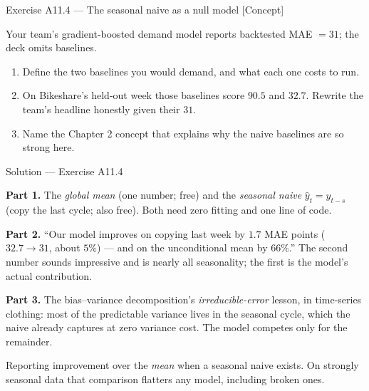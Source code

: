 \documentclass[aspectratio=169,11pt]{beamer}
\begin{document}
\begin{frame}{Exercise A11.4 --- The seasonal naive as a null model [Concept]}
  \begin{exercise}
    Your team's gradient-boosted demand model reports backtested MAE $= 31$; the
    deck omits baselines.
    \begin{enumerate}
      \item Define the two baselines you would demand, and what each one costs to
            run.
      \item On Bikeshare's held-out week those baselines score $90.5$ and $32.7$.
            Rewrite the team's headline honestly given their $31$.
      \item Name the Chapter 2 concept that explains why the naive baselines are
            so strong here.
    \end{enumerate}
  \end{exercise}
\end{frame}

\begin{frame}{Solution --- Exercise A11.4}
  \begin{solutionbox}
    \footnotesize
    \textbf{Part 1.} The \emph{global mean} (one number; free) and the
    \emph{seasonal naive} $\hat y_{t} = y_{t - s}$ (copy the last cycle; also
    free). Both need zero fitting and one line of code.
    \par\smallskip
    \textbf{Part 2.} ``Our model improves on copying last week by $1.7$ MAE points
    ($32.7 \to 31$, about $5\%$) --- and on the unconditional mean by $66\%$.''
    The second number sounds impressive and is nearly all seasonality; the first
    is the model's actual contribution.
    \par\smallskip
    \textbf{Part 3.} The bias--variance decomposition's \emph{irreducible-error}
    lesson, in time-series clothing: most of the predictable variance lives in the
    seasonal cycle, which the naive already captures at zero variance cost. The
    model competes only for the remainder.
  \end{solutionbox}
  \begin{mistake}
    Reporting improvement over the \emph{mean} when a seasonal naive exists. On
    strongly seasonal data that comparison flatters any model, including broken
    ones.
  \end{mistake}
\end{frame}
\end{document}
